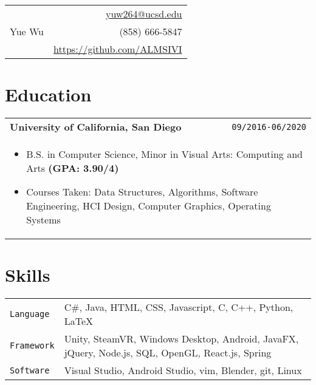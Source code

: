 \documentclass[10pt, letterpaper]{article}
\newcommand{\itemcols}[1]{
	\multicolumn{2}{p{\dimexpr \linewidth-2\tabcolsep}}{
	\begin{itemize}
		#1
	\end{itemize}
	}
}
\begin{document}
\noindent
\begin{tabularx}{\linewidth}{X r}
	\multirow{3}{*}{{\fontsize{40}{50}\selectfont Yue Wu}}
	& \href{mailto:yuw264@ucsd.edu}{yuw264@ucsd.edu} \\
	& (858) 666-5847 \\
	& \href{https://github.com/ALMSIVI}{https://github.com/ALMSIVI}
\end{tabularx}

\noindent

\begin{comment}
\begin{tabularx}{\linewidth}{X r}
\multirow{4}{*}{{\fontsize{45}{60}\selectfont Yue Wu}} 
& \href{mailto:yuw264@ucsd.edu}{yuw264@ucsd.edu} \\
& (858) 666-5847 \\
& 8840 Costa Verde Blvd. Apt. 3322 \\
& San Diego, CA 92122
\end{tabularx}
\end{comment}


\section{Education}
\smallskip
\noindent
\begin{tabularx}{\linewidth}{X r}
	\textbf{\large University of California, San Diego} & \texttt{09/2016-06/2020} \\
	\itemcols{
		\item B.S. in Computer Science, Minor in Visual Arts: Computing and Arts \textbf{(GPA: 3.90/4)}
		\item Courses Taken: Data Structures, Algorithms, Software Engineering, HCI Design, Computer Graphics, Operating Systems
	}
\end{tabularx}


\section{Skills}
\smallskip
\noindent
\begin{tabularx}{\linewidth}{l X}
	\texttt{Language} & C\#, Java, HTML, CSS, Javascript, C, C++, Python, \LaTeX \\
	\texttt{Framework} & Unity, SteamVR, Windows Desktop, Android, JavaFX, jQuery, Node.js, SQL, OpenGL, React.js, Spring \\
	\texttt{Software} & Visual Studio, Android Studio, vim, Blender, git, Linux
\end{tabularx}
\end{document}
